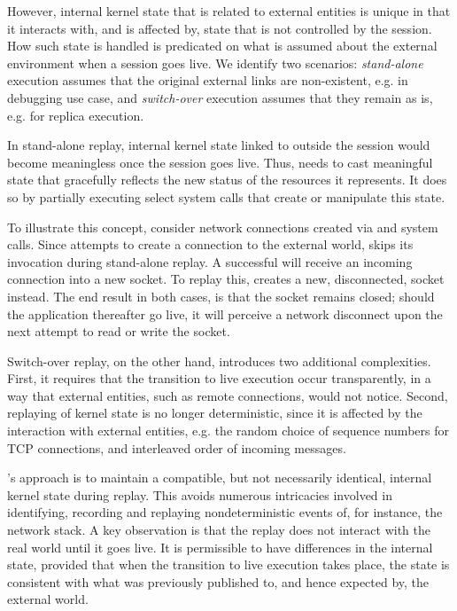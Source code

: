 \begin{table}[]
However, internal kernel state that is related to external entities is
unique in that it interacts with, and is affected by, state that is
not controlled by the session. How such state is handled is predicated
on what is assumed about the external environment when a session goes
live. We identify two scenarios: {\em stand-alone} execution assumes
that the original external links are non-existent, e.g. in debugging
use case, and {\em switch-over} execution assumes that they remain 
as is, e.g. for replica execution.

In stand-alone replay, internal kernel state linked to outside the
session would become meaningless once the session goes live. Thus,
\scribe{} needs to cast meaningful state that gracefully reflects the
new status of the resources it represents. It does so by partially
executing select system calls that create or manipulate this state.

To illustrate this concept, consider network connections created via
 and  system calls. Since 
attempts to create a connection to the external world, \scribe{} skips
its invocation during stand-alone replay. A successful 
will receive an incoming connection into a new socket. To replay
this, \scribe{} creates a new, disconnected, socket instead. The end
result in both cases, is that the socket remains closed; should the
application thereafter go live, it will perceive a network disconnect
upon the next attempt to read or write the socket.
  
  

Switch-over replay, on the other hand, introduces two additional
complexities. First, it requires that the transition to live execution
occur transparently, in a way that external entities, such as remote
connections, would not notice. Second, replaying of kernel state is
no longer deterministic, since it is affected by the interaction with
external entities, e.g. the random choice of sequence numbers for TCP
connections, and interleaved order of incoming messages.

\scribe{}'s approach is to maintain a compatible, but not necessarily
identical, internal kernel state during replay. This avoids
numerous intricacies involved in identifying, recording and replaying
nondeterministic events of, for instance, the network stack. A key
observation is that the replay does not interact with the real world
until it goes live. It is permissible to have differences
in the internal state, provided that when the transition to live
execution takes place, the state is consistent with what was previously
published to, and hence expected by, the external world.


\end{table}
